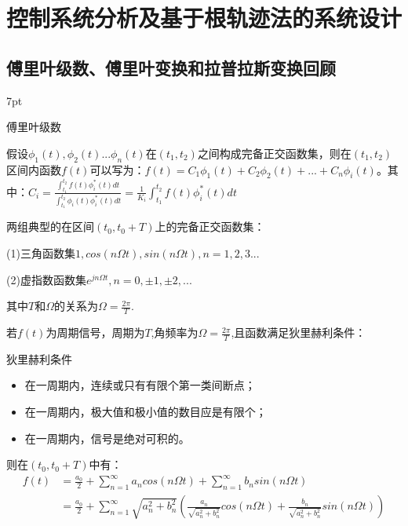\documentclass{article}
\numberwithin{equation}{section}
\numberwithin{figure}{section}
\newenvironment{formal}{%
\def\FrameCommand{%
\hspace{1pt}%
{\color{DarkBlue}\vrule width 2pt}%
{\color{formalshade}\vrule width 4pt}%
\colorbox{formalshade}%
}%
\MakeFramed{\advance\hsize-\width\FrameRestore}%
\noindent\hspace{-4.55pt}%
\begin{adjustwidth}{}{7pt}%
\vspace{2pt}\vspace{2pt}%
}
{%
\vspace{2pt}\end{adjustwidth}\endMakeFramed%
}
\begin{document}
\newpage

\section{控制系统分析及基于根轨迹法的系统设计}
\subsection{傅里叶级数、傅里叶变换和拉普拉斯变换回顾}
\begin{formal}
    傅里叶级数
\end{formal}

假设$\phi_1(t),\phi_2(t)...\phi_n(t)$在$(t_1,t_2)$之间构成完备正交函数集，则在$(t_1,t_2)$区间内函数$f(t)$可以写为：$f(t)=C_1\phi_1(t)+C_2\phi_2(t)+...+C_n\phi_i(t)$。其中：$C_i=\frac{\int_{t_1}^{t_2}f(t)\phi^*_i(t)dt}{\int_{t_1}^{t_2}\phi_i(t)\phi^*_i(t)dt}=\frac{1}{K_i}\int_{t_1}^{t_2}f(t)\phi^*_i(t)dt$

两组典型的在区间$(t_0,t_0+T)$上的完备正交函数集：

(1)三角函数集{$1,cos(n\Omega t),sin(n\Omega t),n=1,2,3...$}

(2)虚指数函数集{$e^{jn\Omega t},n=0,\pm1,\pm2,...$ }

其中$T$和$\Omega$的关系为$\Omega=\frac{2\pi}{T}$.

若$f(t)$为周期信号，周期为$T$,角频率为$\Omega=\frac{2\pi}{T}$,且函数满足狄里赫利条件：
\begin{Definition}{狄里赫利条件}{}
    \begin{itemize}
        \item 在一周期内，连续或只有有限个第一类间断点；
        \item 在一周期内，极大值和极小值的数目应是有限个；
        \item 在一周期内，信号是绝对可积的。
    \end{itemize}
\end{Definition}

则在$(t_0,t_0+T)$中有：
\begin{equation}
    \begin{split}
        f(t)&=\frac{a_0}{2}+\sum_{n = 1}^{\infty} a_ncos(n\Omega t)+ \sum_{n = 1}^{\infty} b_nsin(n\Omega t)\\
        &=\frac{a_0}{2}+\sum_{n = 1}^{\infty}\sqrt{a_n^2+b_n^2}(\frac{a_n}{\sqrt{a_n^2+b_n^2}}cos(n\Omega t)+\frac{b_n}{\sqrt{a_n^2+b_n^2}}sin(n\Omega t))
    \end{split}
\end{equation}
\end{document}
